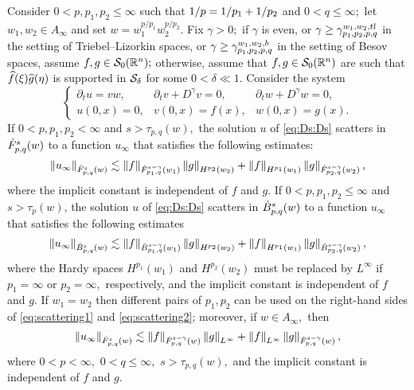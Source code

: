  
 \begin{theorem}\label{thm:scattering} Consider  $0 < p, p_1, p_2  \le \infty$  such that $\hcline$ and  $0 < q \leq \infty;$ let  $w_1,w_2\in A_\infty$ and set $w=w_1^{{p}/{p_1}} w_2^{{p}/{p_2}}.$ 
Fix $\gamma>0;$ if $\gamma$ is even, or $\gamma\ge \gamt$ in the setting of Triebel--Lizorkin spaces, or $\gamma\ge \gamb$ in the setting of Besov spaces, assume $f, g \in \swz;$ otherwise, assume that $f,g\in\swz$ are such that $\fhat(\xi)\ghat(\eta)$ is supported in $\Ss_{\delta}$ for some $0<\delta\ll1.$ Consider the system 
\begin{equation}\label{eq:Ds:Ds}
\left\{ \begin{array}{lll}  \partial_t u =vw, & \partial_t v +D^\gamma v = 0, & \partial_t w + D^\gamma w = 0, \\
  u(0,x)=0,&v(0,x)=f(x),&w(0,x) = g(x).
 \end{array} \right.
\end{equation}
If $0 < p,p_1,p_2 < \infty$ and  $s > \tau_{p,q}(w),$ the solution $u$ of \eqref{eq:Ds:Ds}  scatters in $\tlw{p}{s}{q}{w}$ to a function $u_\infty$ that satisfies the following estimates: 
\begin{equation}\label{eq:scattering1}
\norm{u_\infty}{\tlw{p}{s}{q}{w}} \lesssim \norm{f}{\tlw{p_1}{s-\gamma}{q}{w_1} } \norm{g}{H^{p_2}(w_2)} +  \norm{f}{H^{p_1}(w_1)}   \norm{g}{\tlw{p_2}{s-\gamma}{q}{w_2} },
\end{equation}
where the implicit constant is independent of $f$ and $g.$
If $0< p, p_1,p_2\leq \infty$ and $s > \tau_p(w)$, the solution $u$ of \eqref{eq:Ds:Ds}  scatters in $\besw{p}{s}{q}{w}$ to a function $u_\infty$ that satisfies the following estimates
\begin{equation}\label{eq:scattering2}
\norm{u_\infty}{\besw{p}{s}{q}{w}} \lesssim \norm{f}{\besw{p_1}{s-\gamma}{q}{w_1} } \norm{g}{H^{p_2}(w_2)} +  \norm{f}{H^{p_1}(w_1)}   \norm{g}{\besw{p_2}{s-\gamma}{q}{w_2} },
\end{equation}
where the Hardy spaces $H^{p_1}(w_1)$ and $H^{p_2}(w_2)$ must be replaced by $L^\infty$ if $p_1=\infty$ or $p_2=\infty,$ respectively, and the implicit constant is independent of $f$ and $g.$ 
If $w_1=w_2$ then different pairs of $p_1, p_2$ can be used on the right-hand sides of \eqref{eq:scattering1} and \eqref{eq:scattering2}; moreover, if $w\in A_\infty,$ then 
\begin{equation*}
\norm{u_\infty}{\tlw{p}{s}{q}{w}} \lesssim \norm{f}{\tlw{p}{s-\gamma}{q}{w} } \norm{g}{L^\infty} +  \norm{f}{L^\infty}   \norm{g}{\tlw{p}{s-\gamma}{q}{w}},
\end{equation*}
where $0<p<\infty,$ $0<q\le\infty,$  $s>\tau_{p,q}(w),$ and the implicit constant is independent of $f$ and $g.$ 
\end{theorem} 


